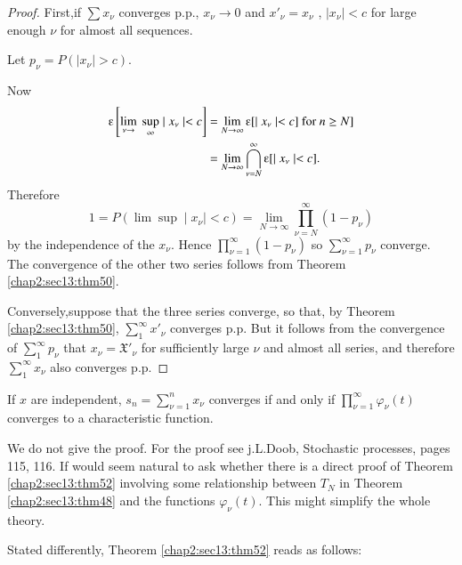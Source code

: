 \begin{proof}
  First,if $\sum x_\nu$ converges p.p., $x_\nu \rightarrow 0$ and
  $x'_\nu = x_\nu$ , $\mid x_\nu \mid < c$ for large enough $\nu$ for
  almost all sequences.  
  
  Let $p_\nu =P(\mid x_\nu \mid > c)$. 
  
  Now
  \begin{align*}
    \varepsilonup \left[\lim\limits_{\nu \rightarrow} ~\sup\limits_{\infty}\mid
      x_\nu \mid < c\right] 
    &=\lim\limits_{N \rightarrow \infty} \varepsilonup[\mid x_\nu \mid <
      c] ~\text{for}~ n \geq N]\\ 
      &= \lim\limits_{N \rightarrow \infty} \bigcap^{\infty}_{\nu = N}
      \varepsilonup [\mid x_\nu \mid < c]. 
  \end{align*}
  Therefore
  $$
  1= P(\lim \sup \mid x_\nu \mid < c) = \lim\limits_{N \rightarrow
    \infty} \prod^{\infty}_{\nu =N} (1-p_\nu)
  $$
  by the independence of the $x_\nu$. Hence $\prod\limits^{\infty} 
  _{\nu =1}  (1-p_\nu)$ so $\sum\limits^{\infty}_{\nu =1}p_\nu$ 
  converge. The convergence of the other two series follows from
  Theorem \ref{chap2:sec13:thm50}.
  
  Conversely,\pageoriginale suppose that the three series converge, so that, by
  Theorem \ref{chap2:sec13:thm50}, $\sum\limits^{\infty}_{1} x'_\nu$
  converges p.p. But it 
  follows from the convergence of $\sum\limits_1^\infty p_\nu$ that $x_\nu =
  \mathfrak{X} '_\nu$ for sufficiently large $\nu$ and almost all
  series, and therefore $\sum\limits^{\infty}_{1} x_\nu$
  also converges p.p. 
\end{proof}

\begin{theorem}\label{chap2:sec13:thm52} %
  If $x$ are independent, $s_n = \sum\limits^{n}_{\nu=1}
  x_\nu $ converges if and only if $\prod^{\infty}_{\nu=1}
  \varphi_\nu(t)$ converges to a characteristic function.  

  We do not give the proof. For the proof see j.L.Doob, Stochastic
  processes, pages 115, 116. If would  seem natural to ask whether there
  is a direct proof of Theorem \ref{chap2:sec13:thm52} involving some
  relationship between 
  $T_N$ in Theorem \ref{chap2:sec13:thm48} and the functions $\varphi_\nu (t)$. This might
  simplify the whole theory. 
  
  Stated differently, Theorem \ref{chap2:sec13:thm52} reads as follows:
\end{theorem}

